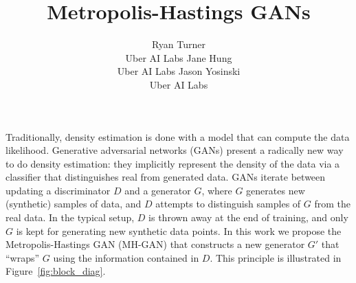\documentclass{article}
\title{Metropolis-Hastings GANs}
\author{
  Ryan Turner \\
  Uber AI Labs
  \And
  Jane Hung \\
  Uber AI Labs
  \And
  Jason Yosinski \\
  Uber AI Labs
}
\begin{document}

\maketitle



Traditionally, density estimation is done with a model that can compute the data likelihood.
Generative adversarial networks (GANs) \citep{Goodfellow2014} present a radically new way to do density estimation:
they implicitly represent the density of the data via a classifier that distinguishes real from generated data.
GANs iterate between updating a discriminator $D$ and a generator $G$, where $G$ generates new (synthetic) samples of data, and $D$ attempts to distinguish samples of $G$ from the real data.
In the typical setup, $D$ is thrown away at the end of training, and only $G$ is kept for generating new synthetic data points.
In this work we propose the Metropolis-Hastings GAN (MH-GAN) that constructs a new generator $G'$ that ``wraps'' $G$ using the information contained in $D$.
This principle is illustrated in Figure~\ref{fig:block_diag}.
\end{document}
